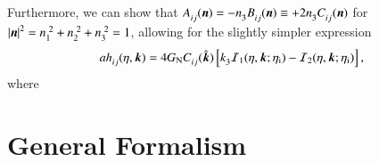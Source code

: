\begin{draft}
\begin{equation}
    \end{equation}
    Furthermore, we can show  that $A\lo{ij}(\vec{n}) = -n\lo{3} B\lo{ij}(\vec{n})\equiv +2n\lo{3} C\lo{ij}(\vec{n}) $ for $\abs{\vec{n}}^2=n\lo{1}\!^2 +n\lo{2}\!^2 +n\lo{3}\!^2 = 1$, allowing for the slightly simpler expression
    \begin{equation}
        ah\lo{ij} (\eta, \vec{k}) = 4G\ped{N} C\lo{ij}(\hat{\vec{k}}) \bclosed{ k\lo{3} \mathcal{I}_1(\eta, \vec{k}; \eta\ped{i}) - \mathcal{I}_2(\eta, \vec{k}; \eta\ped{i}) },
    \end{equation}
    where

\end{draft}



\newpage

\section{General Formalism}






